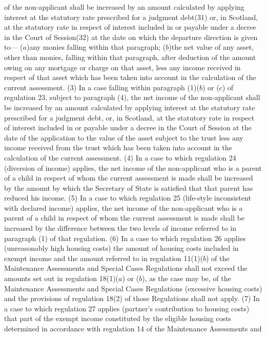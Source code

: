 \documentclass[a4paper]{article}
\begin{document}
of the non-applicant shall be increased by an amount calculated by applying
interest at the statutory rate prescribed for a judgment debt(31) or, in
Scotland, at the statutory rate in respect of interest included in or payable
under a decree in the Court of Session(32) at the date on which the departure
direction is given to—
($a$)any monies falling within that paragraph;
($b$)the net value of any asset, other than monies, falling within that paragraph,
after deduction of the amount owing on any mortgage or charge on that asset,
less any income received in respect of that asset which has been taken into
account in the calculation of the current assessment.
(3) In a case falling within paragraph (1)($b$) or ($c$) of regulation 23, subject
to paragraph (4), the net income of the non-applicant shall be increased by an
amount calculated by applying interest at the statutory rate prescribed for a
judgment debt, or, in Scotland, at the statutory rate in respect of interest
included in or payable under a decree in the Court of Session at the date of the
application to the value of the asset subject to the trust less any income
received from the trust which has been taken into account in the calculation of
the current assessment.
(4) In a case to which regulation 24 (diversion of income) applies, the net
income of the non-applicant who is a parent of a child in respect of whom the
current assessment is made shall be increased by the amount by which the
Secretary of State is satisfied that that parent has reduced his income.
(5) In a case to which regulation 25 (life-style inconsistent with declared
income) applies, the net income of the non-applicant who is a parent of a child
in respect of whom the current assessment is made shall be increased by the
difference between the two levels of income referred to in paragraph (1) of that
regulation.
(6) In a case to which regulation 26 applies (unreasonably high housing costs)
the amount of housing costs included in exempt income and the amount referred to
in regulation 11(1)($b$) of the Maintenance Assessments and Special Cases
Regulations shall not exceed the amounts set out in regulation 18(1)($a$) or ($b$),
as the case may be, of the Maintenance Assessments and Special Cases Regulations
(excessive housing costs) and the provisions of regulation 18(2) of those
Regulations shall not apply.
(7) In a case to which regulation 27 applies (partner’s contribution to housing
costs) that part of the exempt income constituted by the eligible housing costs
determined in accordance with regulation 14 of the Maintenance Assessments and
\end{document}
